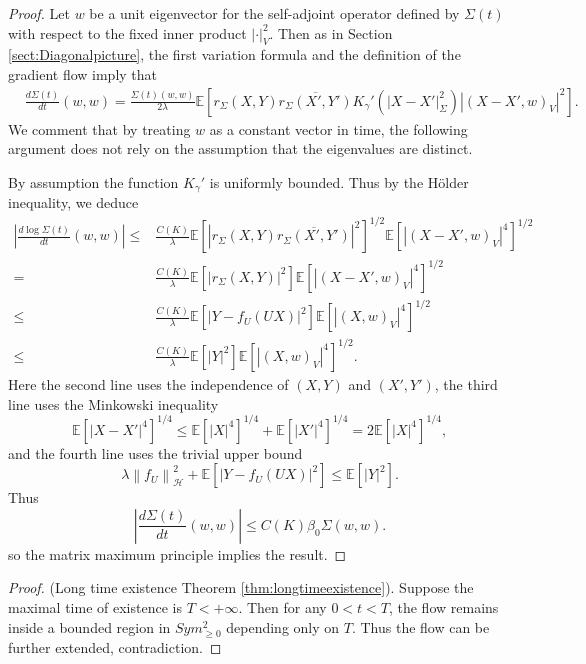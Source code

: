 \documentclass[a4paper]{article}
\theoremstyle{definition}
\newcommand{\norm}[1]{\left\lVert#1\right\rVert}
\newcommand{\E}{\mathbb{E}}
\newcommand{\1}{\mathbbm{1}}
\begin{document}
	
	
	\begin{proof}
		Let $w$ be a unit eigenvector for the self-adjoint operator defined by $\Sigma(t)$ with respect to the fixed inner product $|\cdot|_V^2$. Then as in Section \ref{sect:Diagonalpicture}, the first variation formula and the definition of the gradient flow imply that
		\[
		\begin{split}
			& \frac{d \Sigma(t)}{dt}  (w,w)
			= 
			\frac{\Sigma(t)(w,w)}{2\lambda}   \E[  r_\Sigma(X,Y)  \overline{r_\Sigma(X',Y') }    K_{\gamma}'( |X-X'|_\Sigma^2)  |(X-X', w)_V|^2 ].
		\end{split}
		\]
		We comment that by treating $w$ as a constant vector in time,  the following argument does not rely on the assumption that the eigenvalues are distinct. 
		
		
		
		
		
		By assumption the function $K_\gamma'$ is uniformly bounded. Thus by the H\"older inequality, we deduce
		\[
		\begin{split}
			|\frac{d\log \Sigma(t)}{dt}  (w,w)|
			\leq & \frac{C(K)}{\lambda} \E[|r_\Sigma(X,Y)\overline{r_\Sigma(X',Y')}|^2 ]^{1/2} \E[  |(X-X', w)_V|^4  ]^{1/2}
			\\
			= &  \frac{C(K)}{\lambda} \E[|r_\Sigma(X,Y)|^2 ]  \E[   |(X-X', w)_V|^4   ]^{1/2} 
			\\
			\leq &  \frac{C(K)}{ \lambda} \E[|Y-f_U(UX)|^2 ]  \E[  |(X, w)_V|^4 ]^{1/2}
			\\
			\leq &  \frac{C(K)}{\lambda} \E[|Y|^2 ]  \E[  |(X, w)_V|^4 ]^{1/2}.
		\end{split}
		\]
		Here the second line uses the independence of $(X,Y)$ and $(X',Y')$, the third line uses the Minkowski inequality
		\[
		\E[  |X-X'|^4  ]^{1/4} \leq \E[  |X|^4  ]^{1/4} + \E[  |X'|^4  ]^{1/4} =2 \E[  |X|^4  ]^{1/4} ,
		\]
		and the fourth line uses the trivial upper bound \cite[Lemma 2.4]{RuanLi}
		\[
		\lambda \norm{f_U}_\mathcal{H}^2+ \E[ |Y-f_U(UX)|^2] \leq \E[|Y|^2].
		\]
		Thus 
		\[
		|\frac{d\Sigma(t)}{dt} (w,w)| \leq C(K) \beta_0\Sigma(w,w). 
		\]
		so the matrix maximum principle implies the result. 
	\end{proof}
	
	
	
	
	
	
	
	
	\begin{proof}
		(Long time existence Theorem \ref{thm:longtimeexistence}). Suppose the maximal time of existence is $T<+\infty$. Then for any $0<t<T$, the flow remains inside a bounded region in $Sym^2_{\geq 0}$ depending only on $T$. Thus the flow can be further extended, contradiction. 
	\end{proof}
	
\end{document}
